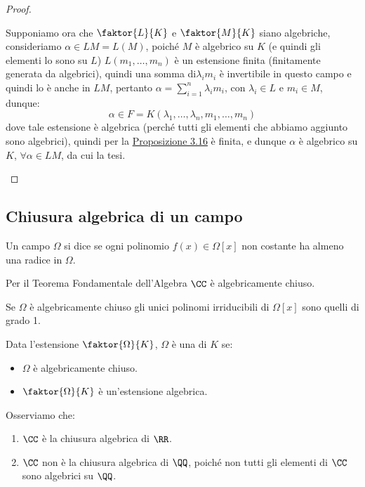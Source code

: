 \documentclass[11pt]{scrartcl}
\begin{document}
\begin{proof}
\begin{enumerate}[(1)]
        Supponiamo ora che $\faktor{L}{K}$ e $\faktor{M}{K}$ siano algebriche, consideriamo $\alpha \in LM = L(M)$, poiché $M$ è algebrico su $K$ (e quindi gli elementi lo sono su $L$)  $L(m_1,\ldots,m_n)$ è un estensione finita (finitamente generata da algebrici), quindi una somma di$ \lambda_i m_i$ è invertibile in questo campo e quindi
        lo è anche in $LM$, pertanto $\alpha = \sum_{i=1}^{n} \lambda_i m_i$, con $\lambda_i \in L$ e $m_i \in M$, dunque:
         \[ \alpha \in F = K(\lambda_1,\ldots,\lambda_n,m_1,\ldots,m_n)
            \]
        dove tale estensione è algebrica (perché tutti gli elementi che abbiamo aggiunto sono algebrici), quindi per la \hyperref[3.16]{Proposizione 3.16} è finita,
        e dunque $\alpha$ è algebrico su $K$, $\forall \alpha \in LM$, da cui la tesi.
    \end{enumerate}
\end{proof}

\newpage
\subsection{Chiusura algebrica di un campo}
\begin{definition}
    Un campo $\Omega$ si dice  se ogni polinomio $f(x) \in \Omega[x]$ non costante ha almeno una radice in $\Omega$.
\end{definition}

\begin{example}
    Per il Teorema Fondamentale dell'Algebra $\CC$ è algebricamente chiuso.
\end{example}

\begin{remark}
    Se $\Omega$ è algebricamente chiuso gli unici polinomi irriducibili di $\Omega[x]$ sono quelli di grado 1.
\end{remark}

\begin{definition}
    Data l'estensione $\faktor{\Omega}{K}$, $\Omega$ è una  di $K$ se:
    \begin{itemize}
        \item $\Omega$ è algebricamente chiuso.
        \item $\faktor{\Omega}{K}$ è un'estensione algebrica.
    \end{itemize}
\end{definition}

\begin{example}
    Osserviamo che:
    \begin{enumerate}[(1)]
        \item $\CC$ è la chiusura algebrica di $\RR$.
        \item $\CC$ non è la chiusura algebrica di $\QQ$, poiché non tutti gli elementi di $\CC$ sono algebrici su $\QQ$.
    \end{enumerate}
\end{example}
\end{document}
